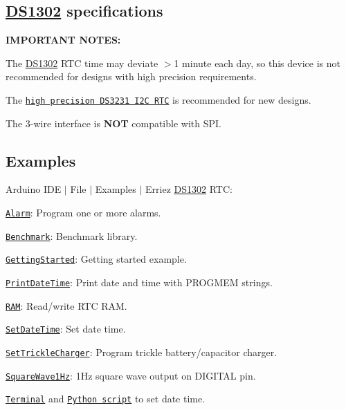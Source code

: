 \subsection*{\hyperlink{class_d_s1302}{D\+S1302} specifications}

{\bfseries I\+M\+P\+O\+R\+T\+A\+NT N\+O\+T\+ES\+:}


\begin{DoxyItemize}
\item The \hyperlink{class_d_s1302}{D\+S1302} R\+TC time may deviate $>$1 minute each day, so this device is not recommended for designs with high precision requirements.
\item The \href{https://github.com/Erriez/ErriezDS3231}{\tt high precision D\+S3231 I2C R\+TC} is recommended for new designs.
\item The 3-\/wire interface is {\bfseries N\+OT} compatible with S\+PI.
\end{DoxyItemize}

\subsection*{Examples}

Arduino I\+DE $\vert$ File $\vert$ Examples $\vert$ Erriez \hyperlink{class_d_s1302}{D\+S1302} R\+TC\+:


\begin{DoxyItemize}
\item \href{https://github.com/Erriez/ErriezDS1302/blob/master/examples/Alarm/Alarm.ino}{\tt Alarm}\+: Program one or more alarms.
\item \href{https://github.com/Erriez/ErriezDS1302/blob/master/examples/Benchmark/Benchmark.ino}{\tt Benchmark}\+: Benchmark library.
\item \href{https://github.com/Erriez/ErriezDS1302/blob/master/examples/GettingStarted/GettingStarted.ino}{\tt Getting\+Started}\+: Getting started example.
\item \href{https://github.com/Erriez/ErriezDS1302/blob/master/examples/PrintDateTime/PrintDateTime.ino}{\tt Print\+Date\+Time}\+: Print date and time with P\+R\+O\+G\+M\+EM strings.
\item \href{https://github.com/Erriez/ErriezDS1302/blob/master/examples/RAM/RAM.ino}{\tt R\+AM}\+: Read/write R\+TC R\+AM.
\item \href{https://github.com/Erriez/ErriezDS1302/blob/master/examples/SetDateTime/SetDateTime.ino}{\tt Set\+Date\+Time}\+: Set date time.
\item \href{https://github.com/Erriez/ErriezDS1302/blob/master/examples/SetTrickleCharger/SetTrickleCharger.ino}{\tt Set\+Trickle\+Charger}\+: Program trickle battery/capacitor charger.
\item \href{https://github.com/Erriez/ErriezDS1302/blob/master/examples/SquareWave1Hz/SquareWave1Hz.ino}{\tt Square\+Wave1\+Hz}\+: 1\+Hz square wave output on D\+I\+G\+I\+T\+AL pin.
\item \href{https://github.com/Erriez/ErriezDS1302/blob/master/examples/Terminal/Terminal.ino}{\tt Terminal} and \href{https://github.com/Erriez/ErriezDS1302/blob/master/examples/Terminal/Terminal.py}{\tt Python script} to set date time.
\end{DoxyItemize}

